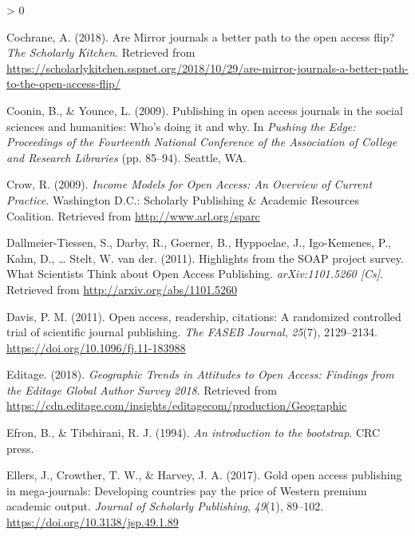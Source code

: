 \documentclass[
  english,
  man]{apa6}
\newlength{\cslhangindent}
\newenvironment{CSLReferences}[2] %
 {%
  \setlength{\parindent}{0pt}
  \ifodd #1 \everypar{\setlength{\hangindent}{\cslhangindent}}\ignorespaces\fi
  \ifnum #2 > 0
  \setlength{\parskip}{#2\baselineskip}
  \fi
 }%
 {}
\begin{document}
\begin{CSLReferences}{1}{0}
\leavevmode\hypertarget{ref-cochrane_are_2018}{}%
Cochrane, A. (2018). Are {Mirror} journals a better path to the open access flip? \emph{The Scholarly Kitchen}. Retrieved from \url{https://scholarlykitchen.sspnet.org/2018/10/29/are-mirror-journals-a-better-path-to-the-open-access-flip/}

\leavevmode\hypertarget{ref-coonin_publishing_2009}{}%
Coonin, B., \& Younce, L. (2009). Publishing in open access journals in the social sciences and humanities: {Who}'s doing it and why. In \emph{Pushing the {Edge}: {Proceedings} of the {Fourteenth} {National} {Conference} of the {Association} of {College} and {Research} {Libraries}} (pp. 85--94). Seattle, WA.

\leavevmode\hypertarget{ref-crow_income_2009}{}%
Crow, R. (2009). \emph{Income {Models} for {Open} {Access}: {An} {Overview} of {Current} {Practice}}. Washington D.C.: Scholarly Publishing \& Academic Resources Coalition. Retrieved from \url{http://www.arl.org/sparc}

\leavevmode\hypertarget{ref-dallmeier-tiessen_highlights_2011}{}%
Dallmeier-Tiessen, S., Darby, R., Goerner, B., Hyppoelae, J., Igo-Kemenes, P., Kahn, D., \ldots{} Stelt, W. van der. (2011). Highlights from the {SOAP} project survey. {What} {Scientists} {Think} about {Open} {Access} {Publishing}. \emph{arXiv:1101.5260 {[}Cs{]}}. Retrieved from \url{http://arxiv.org/abs/1101.5260}

\leavevmode\hypertarget{ref-davis_open_2011}{}%
Davis, P. M. (2011). Open access, readership, citations: A randomized controlled trial of scientific journal publishing. \emph{The FASEB Journal}, \emph{25}(7), 2129--2134. \url{https://doi.org/10.1096/fj.11-183988}

\leavevmode\hypertarget{ref-editage_geographic_2018}{}%
Editage. (2018). \emph{Geographic {Trends} in {Attitudes} to {Open} {Access}: {Findings} from the {Editage} {Global} {Author} {Survey} 2018}. Retrieved from \url{https://cdn.editage.com/insights/editagecom/production/Geographic}

\leavevmode\hypertarget{ref-efron_introduction_1994}{}%
Efron, B., \& Tibshirani, R. J. (1994). \emph{An introduction to the bootstrap}. CRC press.

\leavevmode\hypertarget{ref-ellers_gold_2017}{}%
Ellers, J., Crowther, T. W., \& Harvey, J. A. (2017). Gold open access publishing in mega-journals: Developing countries pay the price of {Western} premium academic output. \emph{Journal of Scholarly Publishing}, \emph{49}(1), 89--102. \url{https://doi.org/10.3138/jsp.49.1.89}


\end{CSLReferences}
\end{document}
